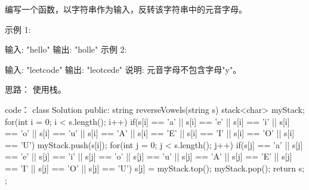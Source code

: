 编写一个函数，以字符串作为输入，反转该字符串中的元音字母。

示例 1:

输入: "hello"
输出: "holle"
示例 2:

输入: "leetcode"
输出: "leotcede"
说明:
元音字母不包含字母"y"。



















思路：
使用栈。





















code：
class Solution {
public:
    string reverseVowels(string s) {
        stack<char> myStack;
        for(int i = 0; i < s.length(); i++)
        {
            if(s[i] == 'a' || s[i] == 'e' || s[i] == 'i' || s[i] == 'o' || s[i] == 'u' || s[i] == 'A' || s[i] == 'E' || s[i] == 'I' || s[i] == 'O' || s[i] == 'U')
            {
                myStack.push(s[i]);
            }
        }
        for(int j = 0; j < s.length(); j++)
        {
            if(s[j] == 'a' || s[j] == 'e' || s[j] == 'i' || s[j] == 'o' || s[j] == 'u' || s[j] == 'A' || s[j] == 'E' || s[j] == 'I' || s[j] == 'O' || s[j] == 'U')
            {
                s[j] = myStack.top();
                myStack.pop();
            }
        }
        return s;
    }
};